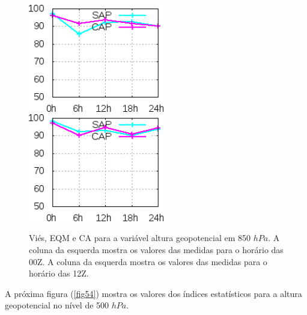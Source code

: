 \begin{figure}[!hbp]
\includegraphics[height=4.7cm]{./figs/CA850zgeo0Z.png}\hspace{1.0cm}\includegraphics[height=4.7cm]{./figs/CA850zgeo12Z.png}
\caption{Viés, EQM e CA para a variável altura geopotencial em 850 $hPa$. A coluna da esquerda mostra os valores das medidas para o horário das 00Z. A coluna da esquerda mostra os valores das medidas para o horário das 12Z.}
\label{fig53}
\end{figure}

A próxima figura (\autoref{fig54}) mostra os valores dos índices estatísticos para a altura geopotencial no nível de 500 $hPa$.

